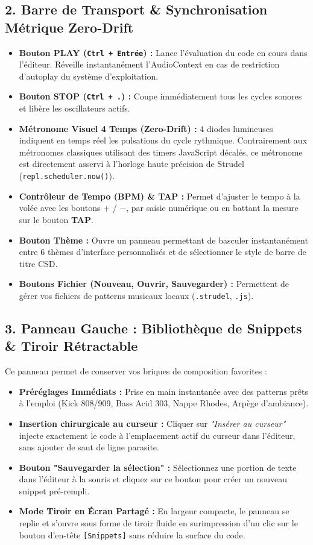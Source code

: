 \documentclass[a4paper,10pt]{article}
\begin{document}
\subsection{2. Barre de Transport \& Synchronisation Métrique Zero-Drift}
\begin{itemize}
    \item \textbf{Bouton PLAY (\texttt{Ctrl + Entrée}) :} Lance l'évaluation du code en cours dans l'éditeur. Réveille instantanément l'AudioContext en cas de restriction d'autoplay du système d'exploitation.
    \item \textbf{Bouton STOP (\texttt{Ctrl + .}) :} Coupe immédiatement tous les cycles sonores et libère les oscillateurs actifs.
    \item \textbf{Métronome Visuel 4 Temps (Zero-Drift) :} 4 diodes lumineuses indiquent en temps réel les pulsations du cycle rythmique. Contrairement aux métronomes classiques utilisant des timers JavaScript décalés, ce métronome est directement asservi à l'horloge haute précision de Strudel (\texttt{repl.scheduler.now()}).
    \item \textbf{Contrôleur de Tempo (BPM) \& TAP :} Permet d'ajuster le tempo à la volée avec les boutons $+$ / $-$, par saisie numérique ou en battant la mesure sur le bouton \textbf{TAP}.
    \item \textbf{Bouton Thème :} Ouvre un panneau permettant de basculer instantanément entre 6 thèmes d'interface personnalisés et de sélectionner le style de barre de titre CSD.
    \item \textbf{Boutons Fichier (Nouveau, Ouvrir, Sauvegarder) :} Permettent de gérer vos fichiers de patterns musicaux locaux (\texttt{.strudel}, \texttt{.js}).
\end{itemize}

\subsection{3. Panneau Gauche : Bibliothèque de Snippets \& Tiroir Rétractable}
Ce panneau permet de conserver vos briques de composition favorites :
\begin{itemize}
    \item \textbf{Préréglages Immédiats :} Prise en main instantanée avec des patterns prêts à l'emploi (Kick 808/909, Bass Acid 303, Nappe Rhodes, Arpège d'ambiance).
    \item \textbf{Insertion chirurgicale au curseur :} Cliquer sur \textit{"Insérer au curseur"} injecte exactement le code à l'emplacement actif du curseur dans l'éditeur, sans ajouter de saut de ligne parasite.
    \item \textbf{Bouton "Sauvegarder la sélection" :} Sélectionnez une portion de texte dans l'éditeur à la souris et cliquez sur ce bouton pour créer un nouveau snippet pré-rempli.
    \item \textbf{Mode Tiroir en Écran Partagé :} En largeur compacte, le panneau se replie et s'ouvre sous forme de tiroir fluide en surimpression d'un clic sur le bouton d'en-tête \texttt{[Snippets]} sans réduire la surface du code.
\end{itemize}
\end{document}
